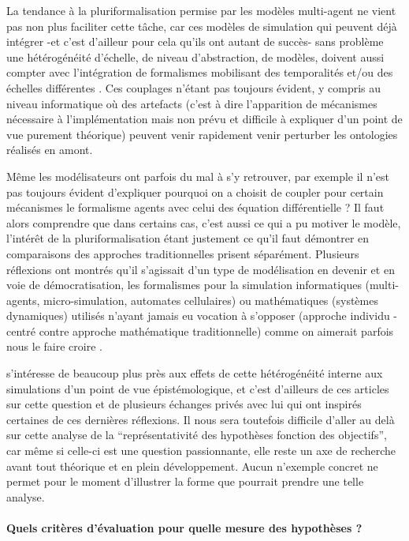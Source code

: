 La tendance à la pluriformalisation  permise par les modèles multi-agent ne vient pas non plus faciliter cette tâche, car ces modèles de simulation qui peuvent déjà intégrer -et c'est d'ailleur pour cela qu'ils ont autant de succès- sans problème une hétérogénéité d'échelle, de niveau d'abstraction, de modèles, doivent aussi compter avec l'intégration de formalismes mobilisant des temporalités et/ou des échelles différentes \autocites{Varenne2008,Varenne2012a}. Ces couplages n'étant pas toujours évident, y compris au niveau informatique où des artefacts (c'est à dire l'apparition de mécanismes nécessaire à l'implémentation mais non prévu et difficile à expliquer d'un point de vue purement théorique) peuvent venir rapidement venir perturber les ontologies réalisés en amont. 

Même les modélisateurs ont parfois du mal à s'y retrouver, par exemple il n'est pas toujours évident d'expliquer pourquoi on a choisit de coupler pour certain mécanismes le formalisme agents avec celui des équation différentielle ? Il faut alors comprendre que dans certains cas, c'est aussi ce qui a pu motiver le modèle, l'intérêt de la pluriformalisation étant justement ce qu'il faut démontrer en comparaisons des approches traditionnelles prisent séparément. Plusieurs réflexions ont montrés qu'il s'agissait d'un type de modélisation en devenir et en voie de démocratisation, les formalismes pour la simulation informatiques (multi-agents, micro-simulation, automates cellulaires) ou mathématiques (systèmes dynamiques) utilisés n'ayant jamais eu vocation à s'opposer (approche individu - centré contre approche mathématique traditionnelle) comme on aimerait parfois nous le faire croire \autocites{Sanders2013, Banos2013}. 

\textcite{Varenne2013b} s’intéresse de beaucoup plus près aux effets de cette hétérogénéité interne aux simulations d’un point de vue épistémologique, et c’est d'ailleurs de ces articles sur cette question et de plusieurs échanges privés avec lui qui ont inspirés certaines de ces dernières réflexions. Il nous sera toutefois difficile d’aller au delà sur cette analyse de la \enquote{représentativité des hypothèses fonction des objectifs}, car même si celle-ci est une question passionnante, elle reste un axe de recherche avant tout théorique et en plein développement. Aucun n'exemple concret ne permet pour le moment d'illustrer la forme que pourrait prendre une telle analyse.

\paragraph{Quels critères d'évaluation pour quelle mesure des hypothèses ?}

